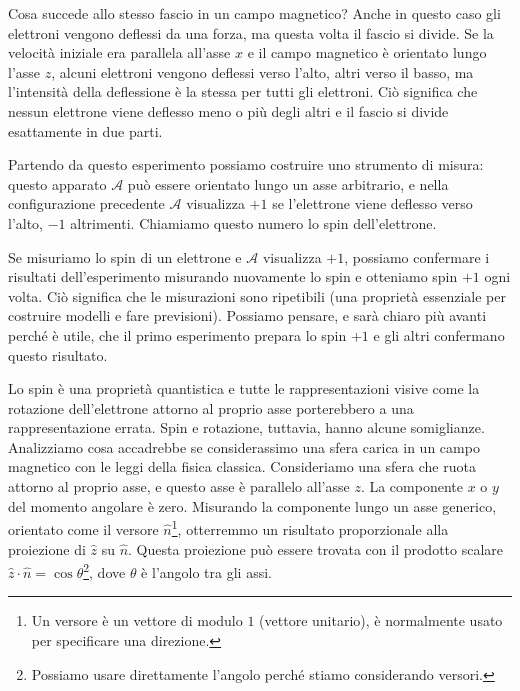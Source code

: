 Cosa succede allo stesso fascio in un campo magnetico? Anche in questo caso gli elettroni vengono deflessi da una forza, ma questa volta il fascio si divide. Se la velocità iniziale era parallela all'asse $x$ e il campo magnetico è orientato lungo l'asse $z$, alcuni elettroni vengono deflessi verso l'alto, altri verso il basso, ma l'intensità della deflessione è la stessa per tutti gli elettroni. Ciò significa che nessun elettrone viene deflesso meno o più degli altri e il fascio si divide esattamente in due parti.

Partendo da questo esperimento possiamo costruire uno strumento di misura: questo apparato $\mathcal{A}$ può essere orientato lungo un asse arbitrario, e nella configurazione precedente $\mathcal{A}$ visualizza $+1$ se l'elettrone viene deflesso verso l'alto, $-1$ altrimenti. Chiamiamo questo numero lo spin dell'elettrone.

Se  misuriamo lo spin di un elettrone e $\mathcal{A}$ visualizza $+1$, possiamo confermare i risultati dell'esperimento misurando nuovamente lo spin e otteniamo spin $+1$ ogni volta. Ciò significa che le misurazioni sono ripetibili (una proprietà essenziale per costruire modelli e fare previsioni). Possiamo pensare, e sarà chiaro più avanti perché è utile, che il primo esperimento prepara lo spin $+1$ e gli altri confermano questo risultato.

Lo spin è una proprietà quantistica e tutte le rappresentazioni visive come la rotazione dell'elettrone attorno al proprio asse porterebbero a una rappresentazione errata. Spin e rotazione, tuttavia, hanno alcune somiglianze. Analizziamo cosa accadrebbe se considerassimo una sfera carica in un campo magnetico con le leggi della fisica classica. Consideriamo una sfera che ruota attorno al proprio asse, e questo asse è parallelo all'asse $z$. La componente $x$ o $y$ del momento angolare è zero. Misurando la componente lungo un asse generico, orientato come il versore $\hat{n}$\footnote{Un versore è un vettore di modulo $1$ (vettore unitario), è normalmente usato per specificare una direzione.}, otterremmo un risultato proporzionale alla proiezione di $\hat{z}$ su $\hat{n}$. Questa proiezione può essere trovata con il prodotto scalare $\hat{z}\cdot\hat{n} = \cos{\theta}$\footnote{Possiamo usare direttamente l'angolo perché stiamo considerando versori.}, dove $\theta$ è l'angolo tra gli assi.

